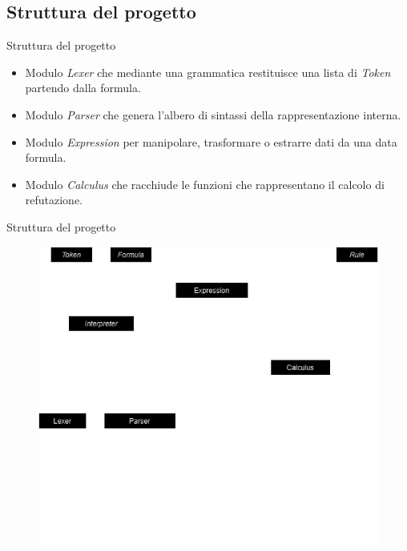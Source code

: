 \documentclass{beamer}
\begin{document}
\begin{darkframes}
    \subsection{Struttura del progetto}
    \begin{frame}{Struttura del progetto}
        \begin{itemize}
            \item Modulo \textit{Lexer} che mediante una grammatica restituisce una lista di \textit{Token} partendo dalla formula.
            \item Modulo \textit{Parser} che genera l'albero di sintassi della rappresentazione interna.
            \item Modulo \textit{Expression} per manipolare, trasformare o estrarre dati da una data formula.
            \item Modulo \textit{Calculus} che racchiude le funzioni che rappresentano il calcolo di refutazione.
        \end{itemize}
    \end{frame}

    \begin{frame}{Struttura del progetto}
        \begin{figure}[h]
            \includegraphics[scale=0.4]{../images/composizione.drawio.png}
        \end{figure}
    \end{frame}


\end{darkframes}
\end{document}
